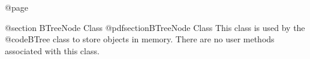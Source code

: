 @page

@section BTreeNode Class
@pdfsection{BTreeNode Class}
This class is used by the @code{BTree} class to store objects in memory.
There are no user methods associated with this class.









